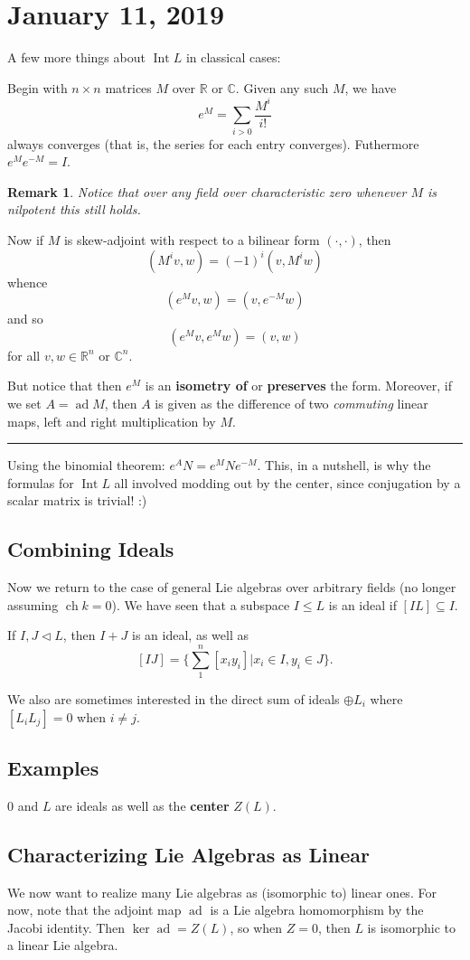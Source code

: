 \documentclass[12pt]{article}
\theoremstyle{nonumberbreak}
\theoremstyle{changebreak}
\theoremstyle{nonumberbreak}
\theoremstyle{change}
\newtheorem{rmk}[thm]{Remark}
\newcommand*{\R}{
\mathbb{R}
}
\newcommand*{\C}{
\mathbb{C}
}
\newcommand*{\brk}{
\rule{2in}{.1pt}
}
\DeclareMathOperator{\ch}{ch}
\DeclareMathOperator{\ad}{ad}
\DeclareMathOperator{\Int}{Int}
\begin{document}
\section{January 11, 2019}
A few more things about $\Int L$ in classical cases:

Begin with $n\times n$ matrices $M$ over $\R$ or $\C$. Given any such $M$, we have
\[e^M=\sum_{i>0}\frac{M^i}{i!}\]
always converges (that is, the series for each entry converges). Futhermore $e^Me^{-M}=I$.
\begin{rmk}
	Notice that over \textit{any} field over characteristic zero whenever $M$ is nilpotent 
	this still holds.
\end{rmk}

Now if $M$ is skew-adjoint with respect to a bilinear form $(\cdot,\cdot)$, then 
\[(M^iv,w)=(-1)^i(v,M^iw)\]
whence
\[(e^Mv, w)=(v,e^{-M}w)\]
and so 
\[(e^Mv,e^Mw)=(v,w)\]
for all $v,w\in\R^n$ or $\C^n$.

But notice that then $e^M$ is an \textbf{isometry of} or \textbf{preserves} the form. Moreover, 
if we set $A=\ad M$, then $A$ is given as the difference of two \textit{commuting} linear maps, 
left and right multiplication by $M$.

\brk

Using the binomial theorem: $e^AN=e^MNe^{-M}$. This, in a nutshell, is why the formulas for
$\Int L$ all involved modding out by the center, since conjugation by a scalar matrix is trivial! :)

\subsection{Combining Ideals}
Now we return to the case of general Lie algebras over arbitrary fields (no longer assuming $\ch k=0$). 
We have seen that a subspace $I\le L$ is an ideal if $[IL]\subseteq I$.

If $I,J\lhd L$, then $I+J$ is an ideal, as well as
\[[IJ]=\{\sum_1^n [x_iy_i]|x_i\in I, y_i\in J\}.\]

We also are sometimes interested in the direct sum of ideals $\oplus L_i$ where $[L_iL_j]=0$ when $i\ne j$.

\subsection{Examples}
$0$ and $L$ are ideals as well as the \textbf{center} $Z(L)$.

\subsection{Characterizing Lie Algebras as Linear}
We now want to realize many Lie algebras as (isomorphic to) linear ones. For now, note that the adjoint map $\ad$
is a Lie algebra homomorphism by the Jacobi identity. Then $\ker\ad=Z(L)$, so when $Z=0$, then $L$ is isomorphic to 
a linear Lie algebra. 
\end{document}
